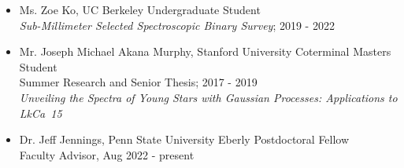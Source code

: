 \begin{itemize}
  \item Ms. Zoe Ko, UC Berkeley Undergraduate Student \\ 
  \emph{Sub-Millimeter Selected Spectroscopic Binary Survey}; 2019 - 2022 
  \item Mr. Joseph Michael Akana Murphy, Stanford University Coterminal Masters Student \\
  Summer Research and Senior Thesis; 2017 - 2019\\
  \emph{Unveiling the Spectra of Young Stars with Gaussian Processes: Applications to LkCa~15}
  \item Dr. Jeff Jennings, Penn State University Eberly Postdoctoral Fellow \\
  Faculty Advisor, Aug 2022 - present\\
\end{itemize}
